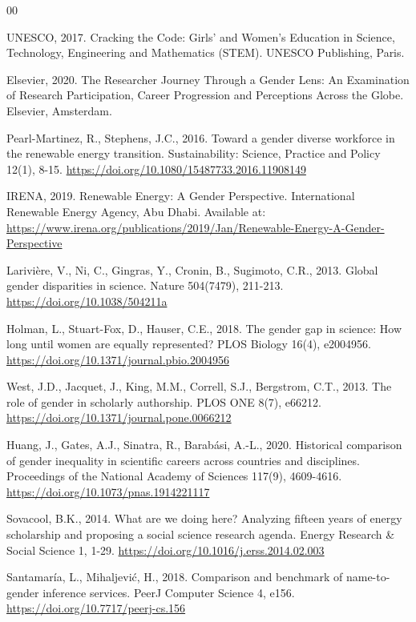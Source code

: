 \documentclass[preprint,12pt,number]{elsarticle}
\begin{document}
\begin{thebibliography}{00}

UNESCO, 2017.
Cracking the Code: Girls' and Women's Education in Science, Technology, Engineering and Mathematics (STEM).
UNESCO Publishing, Paris.

Elsevier, 2020.
The Researcher Journey Through a Gender Lens: An Examination of Research Participation, Career Progression and Perceptions Across the Globe.
Elsevier, Amsterdam.

Pearl-Martinez, R., Stephens, J.C., 2016.
Toward a gender diverse workforce in the renewable energy transition.
Sustainability: Science, Practice and Policy 12(1), 8-15.
\url{https://doi.org/10.1080/15487733.2016.11908149}

IRENA, 2019.
Renewable Energy: A Gender Perspective.
International Renewable Energy Agency, Abu Dhabi.
Available at: \url{https://www.irena.org/publications/2019/Jan/Renewable-Energy-A-Gender-Perspective}

Larivi\`ere, V., Ni, C., Gingras, Y., Cronin, B., Sugimoto, C.R., 2013.
Global gender disparities in science.
Nature 504(7479), 211-213.
\url{https://doi.org/10.1038/504211a}

Holman, L., Stuart-Fox, D., Hauser, C.E., 2018.
The gender gap in science: How long until women are equally represented?
PLOS Biology 16(4), e2004956.
\url{https://doi.org/10.1371/journal.pbio.2004956}

West, J.D., Jacquet, J., King, M.M., Correll, S.J., Bergstrom, C.T., 2013.
The role of gender in scholarly authorship.
PLOS ONE 8(7), e66212.
\url{https://doi.org/10.1371/journal.pone.0066212}

Huang, J., Gates, A.J., Sinatra, R., Barab\'asi, A.-L., 2020.
Historical comparison of gender inequality in scientific careers across countries and disciplines.
Proceedings of the National Academy of Sciences 117(9), 4609-4616.
\url{https://doi.org/10.1073/pnas.1914221117}

Sovacool, B.K., 2014.
What are we doing here? Analyzing fifteen years of energy scholarship and proposing a social science research agenda.
Energy Research \& Social Science 1, 1-29.
\url{https://doi.org/10.1016/j.erss.2014.02.003}

Santamar\'ia, L., Mihaljevi\'c, H., 2018.
Comparison and benchmark of name-to-gender inference services.
PeerJ Computer Science 4, e156.
\url{https://doi.org/10.7717/peerj-cs.156}


\end{thebibliography}
\end{document}
